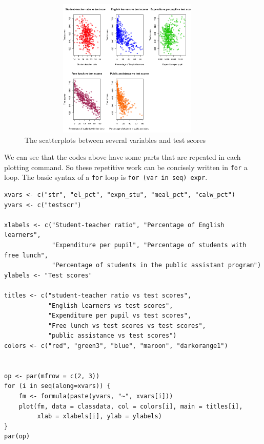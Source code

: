 \documentclass[a4paper,11pt]{article}
\begin{document}
\begin{figure}[htbp]
\centering
\includegraphics[width=400,height=250]{./scplotmat.png}
\caption{The scatterplots between several variables and test scores}
\end{figure}


We can see that the codes above have some parts that are repeated in
each plotting command. So these repetitive work can be concisely
written in \texttt{for} a loop. The basic syntax of a \texttt{for} loop is
\texttt{for (var in seq) expr}.

\begin{verbatim}
xvars <- c("str", "el_pct", "expn_stu", "meal_pct", "calw_pct")
yvars <- c("testscr")

xlabels <- c("Student-teacher ratio", "Percentage of English learners",
             "Expenditure per pupil", "Percentage of students with free lunch",
             "Percentage of students in the public assistant program")
ylabels <- "Test scores"

titles <- c("student-teacher ratio vs test scores",
            "English learners vs test scores",
            "Expenditure per pupil vs test scores",
            "Free lunch vs test scores vs test scores",
            "public assistance vs test scores")
colors <- c("red", "green3", "blue", "maroon", "darkorange1")


op <- par(mfrow = c(2, 3))
for (i in seq(along=xvars)) {
    fm <- formula(paste(yvars, "~", xvars[i]))
    plot(fm, data = classdata, col = colors[i], main = titles[i],
         xlab = xlabels[i], ylab = ylabels)
}
par(op)
\end{verbatim}
\end{document}
